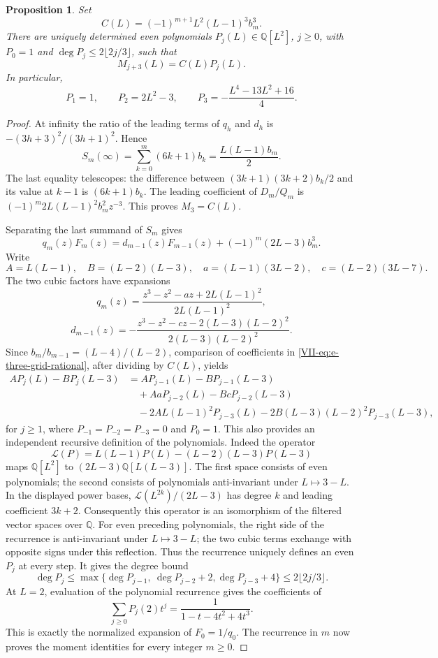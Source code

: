 \documentclass[11pt,letterpaper]{article}
\newtheorem{proposition}[theorem]{Proposition}
\numberwithin{equation}{section}
\begin{document}
\begin{proposition}\label{VII-prop:e-three-grid-moments}
Set
\[
 C(L)=(-1)^{m+1}L^2(L-1)^3b_m^3.
\]
There are uniquely determined even polynomials $P_j(L)\in\mathbb Q[L^2]$,
$j\ge0$, with $P_0=1$ and $\deg P_j\le2\lfloor2j/3\rfloor$, such that
\[
 M_{j+3}(L)=C(L)P_j(L).
\]
In particular,
\[
 P_1=1,\qquad P_2=2L^2-3,\qquad
 P_3=-\frac{L^4-13L^2+16}{4}.
\]
\end{proposition}
\begin{proof}
At infinity the ratio of the leading terms of $q_h$ and $d_h$ is
$-(3h+3)^2/(3h+1)^2$. Hence
\[
 S_m(\infty)=\sum_{k=0}^m(6k+1)b_k
 =\frac{L(L-1)b_m}{2}.
\]
The last equality telescopes: the difference between
$(3k+1)(3k+2)b_k/2$ and its value at $k-1$ is $(6k+1)b_k$.
The leading coefficient of $D_m/Q_m$ is
$(-1)^m2L(L-1)^2b_m^2z^{-3}$. This proves $M_3=C(L)$.

Separating the last summand of $S_m$ gives
\begin{equation}\label{VII-eq:e-three-grid-rational}
 q_m(z)F_m(z)=d_{m-1}(z)F_{m-1}(z)
                         +(-1)^m(2L-3)b_m^3.
\end{equation}
Write
\[
 A=L(L-1),\quad B=(L-2)(L-3),\quad
 a=(L-1)(3L-2),\quad c=(L-2)(3L-7).
\]
The two cubic factors have expansions
\[
 q_m(z)=\frac{z^3-z^2-az+2L(L-1)^2}{2L(L-1)^2},
\]
\[
 d_{m-1}(z)=
 -\frac{z^3-z^2-cz-2(L-3)(L-2)^2}{2(L-3)(L-2)^2}.
\]
Since $b_m/b_{m-1}=(L-4)/(L-2)$, comparison of coefficients in
\eqref{VII-eq:e-three-grid-rational}, after dividing by $C(L)$, yields
\begin{align*}
 A P_j(L)-B P_j(L-3)
 &=A P_{j-1}(L)-B P_{j-1}(L-3)\\
 &\quad+A a P_{j-2}(L)-B c P_{j-2}(L-3)\\
 &\quad-2A L(L-1)^2P_{j-3}(L)
        -2B(L-3)(L-2)^2P_{j-3}(L-3),
\end{align*}
for $j\ge1$, where $P_{-1}=P_{-2}=P_{-3}=0$ and $P_0=1$.
This also provides an independent recursive definition of the
polynomials. Indeed the operator
\[
 \mathcal L(P)=L(L-1)P(L)-(L-2)(L-3)P(L-3)
\]
maps $\mathbb Q[L^2]$ to
$(2L-3)\mathbb Q[L(L-3)]$. The first space consists of even
polynomials; the second consists of polynomials anti-invariant
under $L\mapsto3-L$. In the displayed power bases,
$\mathcal L(L^{2k})/(2L-3)$ has degree $k$ and leading coefficient
$3k+2$. Consequently this operator is an isomorphism of the filtered
vector spaces over $\mathbb Q$.
For even preceding polynomials, the right side of the recurrence is
anti-invariant under $L\mapsto3-L$; the two cubic terms exchange
with opposite signs under this reflection. Thus the recurrence
uniquely defines an even $P_j$ at every step. It gives the degree bound
\[
 \deg P_j\le\max\{\deg P_{j-1},\ \deg P_{j-2}+2,
                                    \deg P_{j-3}+4\}
 \le2\lfloor2j/3\rfloor.
\]
At $L=2$, evaluation of the polynomial recurrence gives the
coefficients of
\[
 \sum_{j\ge0}P_j(2)t^j=\frac1{1-t-4t^2+4t^3}.
\]
This is exactly the normalized expansion of $F_0=1/q_0$.
The recurrence in $m$ now proves the moment identities for every
integer $m\ge0$.
\end{proof}
\end{document}
